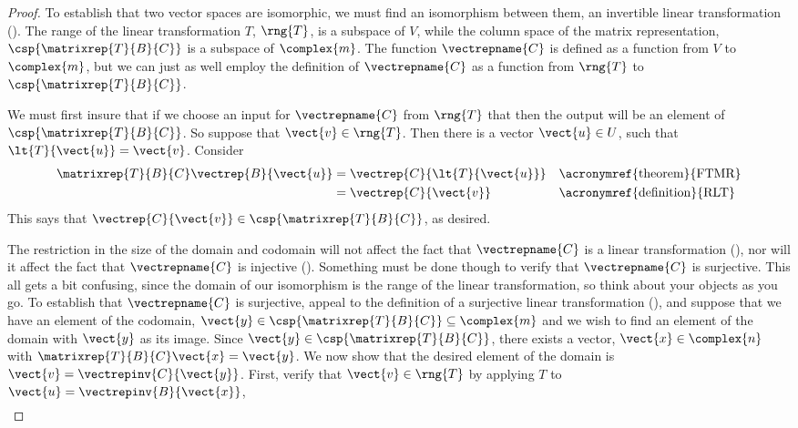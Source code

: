 \begin{proof}
To establish that two vector spaces are isomorphic, we must find an isomorphism between them, an invertible linear transformation ().  The range of the linear transformation $T$, $\rng{T}$, is a subspace of $V$, while the column space of the matrix representation, $\csp{\matrixrep{T}{B}{C}}$ is a subspace of $\complex{m}$.  The function $\vectrepname{C}$ is defined as a function from $V$ to $\complex{m}$, but we can just as well employ the definition of $\vectrepname{C}$ as a function from $\rng{T}$ to $\csp{\matrixrep{T}{B}{C}}$.\par
%
We must first insure that if we choose an input for $\vectrepname{C}$ from $\rng{T}$ that then the output will be an element of $\csp{\matrixrep{T}{B}{C}}$.  So suppose that $\vect{v}\in\rng{T}$.  Then there is a vector $\vect{u}\in U$, such that $\lt{T}{\vect{u}}=\vect{v}$.  Consider
%
\begin{align*}
\matrixrep{T}{B}{C}\vectrep{B}{\vect{u}}
&=\vectrep{C}{\lt{T}{\vect{u}}}&&\text{\acronymref{theorem}{FTMR}}\\
%
&=\vectrep{C}{\vect{v}}&&\text{\acronymref{definition}{RLT}}
%
\end{align*}
%
This says that $\vectrep{C}{\vect{v}}\in\csp{\matrixrep{T}{B}{C}}$, as desired.\par
%
The restriction in the size of the domain and codomain will not affect the fact that $\vectrepname{C}$ is a linear transformation (), nor will it affect the fact that $\vectrepname{C}$ is injective ().  Something must be done though to verify that $\vectrepname{C}$ is surjective.  This all gets a bit confusing, since the domain of our isomorphism is the range of the linear transformation, so think about your objects as you go.  To establish that $\vectrepname{C}$ is surjective, appeal to the definition of a surjective linear transformation (), and suppose that we have an element of the codomain, $\vect{y}\in\csp{\matrixrep{T}{B}{C}}\subseteq\complex{m}$ and we wish to find an element of the domain with $\vect{y}$ as its image.  Since $\vect{y}\in\csp{\matrixrep{T}{B}{C}}$, there exists a vector, $\vect{x}\in\complex{n}$ with $\matrixrep{T}{B}{C}\vect{x}=\vect{y}$.  We now show that the desired element of the domain is $\vect{v}=\vectrepinv{C}{\vect{y}}$.     First, verify that $\vect{v}\in\rng{T}$ by applying $T$ to $\vect{u}=\vectrepinv{B}{\vect{x}}$,
%
\begin{align*}

\end{align*}
\end{proof}
